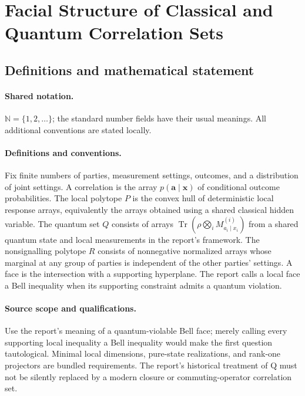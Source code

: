 \documentclass[11pt]{article}
\begin{document}
\section{Facial Structure of Classical and Quantum Correlation Sets}\label{statement}

\subsection{Definitions and mathematical statement}

\paragraph{Shared notation.}$\mathbb N=\{1,2,\ldots\}$; the standard number fields have their usual meanings. All additional conventions are stated locally.


\paragraph{Definitions and conventions.} Fix finite numbers of parties, measurement settings, outcomes, and a distribution of joint settings. A correlation is the array $p(\mathbf a\mid\mathbf x)$ of conditional outcome probabilities. The local polytope $P$ is the convex hull of deterministic local response arrays, equivalently the arrays obtained using a shared classical hidden variable. The quantum set $Q$ consists of arrays $\operatorname{Tr}(\rho\bigotimes_i M^{(i)}_{a_i\mid x_i})$ from a shared quantum state and local measurements in the report's framework. The nonsignalling polytope $R$ consists of nonnegative normalized arrays whose marginal at any group of parties is independent of the other parties' settings. A face is the intersection with a supporting hyperplane. The report calls a local face a Bell inequality when its supporting constraint admits a quantum violation.

\paragraph{Source scope and qualifications.} Use the report's meaning of a quantum-violable Bell face; merely calling every supporting local inequality a Bell inequality would make the first question tautological. Minimal local dimensions, pure-state realizations, and rank-one projectors are bundled requirements. The report's historical treatment of Q must not be silently replaced by a modern closure or commuting-operator correlation set.
\end{document}

